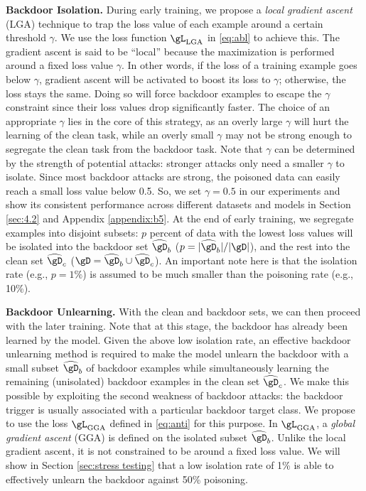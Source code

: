 \noindent\textbf{Backdoor Isolation.} During early training, we propose a \emph{local gradient ascent} (LGA) technique to trap the loss value of each example around a certain threshold $\gamma$. We use the loss function $\gL_{\textup{LGA}}$ in \eqref{eq:abl} to achieve this. The gradient ascent is said to be ``local'' because the maximization is performed around a fixed loss value $\gamma$. In other words, if the loss of a training example goes below $\gamma$, gradient ascent will be activated to boost its loss to $\gamma$; otherwise, the loss stays the same. 
Doing so will force backdoor examples to escape the $\gamma$ constraint since their loss values drop significantly faster. The choice of an appropriate $\gamma$ lies in the core of this strategy, as an overly large $\gamma$ will hurt the learning of the clean task, while an overly small $\gamma$ may not be strong enough to segregate the clean task from the backdoor task. Note that $\gamma$ can be determined by the strength of potential attacks: stronger attacks only need a smaller $\gamma$ to isolate. Since most backdoor attacks are strong, the poisoned data can easily reach a small loss value below 0.5. So, we set $\gamma=0.5$ in our experiments and show its consistent performance across different datasets and models in Section \ref{sec:4.2} and Appendix \ref{appendix:b5}. At the end of early training, we segregate examples into disjoint subsets: $p$ percent of data with the lowest loss values will be isolated into the backdoor set $\widehat{\gD}_b$ ($p=|\widehat{\gD}_b|/|\gD|$), and the rest into the clean set $\widehat{\gD}_c$ ($\gD=\widehat{\gD}_b \cup \widehat{\gD}_c$). An important note here is that the isolation rate (e.g., $p=1\%$) is assumed to be much smaller than the poisoning rate (e.g., 10\%).

\noindent\textbf{Backdoor Unlearning.} With the clean and backdoor sets, we can then proceed %
with the later training. Note that at this stage, the backdoor has already been learned by the model. 
Given the above low isolation rate, an effective backdoor unlearning method is required to make the model unlearn the backdoor with a small subset $\widehat{\gD}_b$ of backdoor examples while simultaneously learning the remaining (unisolated) backdoor examples in the clean set $\widehat{\gD}_c$. We make this possible by exploiting the second weakness of backdoor attacks: the backdoor trigger is usually associated with a particular backdoor target class.
We propose to use the loss $\gL_{\textup{GGA}}$ defined in \eqref{eq:anti} for this purpose. In $\gL_{\textup{GGA}}$, a \emph{global gradient ascent} (GGA) is defined on the isolated subset $\widehat{\gD}_b$. Unlike the local gradient ascent, it is not constrained to be around a fixed loss value. We will show in Section \ref{sec:stress testing} that a low isolation rate of 1\% is able to effectively unlearn the backdoor against 50\% poisoning.

